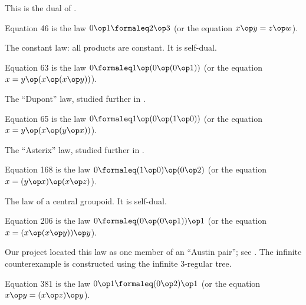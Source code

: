 This is the dual of .

\begin{definition}[Equation 46]\label{eq46}\leanok{}  Equation 46 is the law $0 \op 1  \formaleq  2 \op 3$ (or the equation $x \op y = z \op w$).
\end{definition}

The constant law: all products are constant. It is self-dual.

\begin{definition}[Equation 63]\label{eq63}\leanok{}  Equation 63 is the law $0 \formaleq 1 \op (0 \op (0 \op 1))$ (or the equation $x = y \op (x \op (x \op y))$).
\end{definition}

The ``Dupont'' law, studied further in .

\begin{definition}[Equation 65]\label{eq65}\leanok{}  Equation 65 is the law $0 \formaleq 1 \op (0 \op (1 \op 0))$ (or the equation $x = y \op (x \op (y \op x))$).
\end{definition}

The ``Asterix'' law, studied further in .

\begin{definition}[Equation 168]\label{eq168}\leanok{}  Equation 168 is the law $0  \formaleq  (1 \op 0) \op (0 \op 2)$ (or the equation $x = (y \op x) \op (x \op z)$).
\end{definition}

The law of a central groupoid. It is self-dual.

\begin{definition}[Equation 206]\label{eq206}\leanok{}  Equation 206 is the law $0  \formaleq  (0 \op (0 \op 1)) \op 1$ (or the equation $x = (x \op (x \op y)) \op y$).
\end{definition}

Our project located this law as one member of an ``Austin pair''; see . The infinite counterexample is constructed using the infinite 3-regular tree.

\begin{definition}[Equation 381]\label{eq381}\leanok{}  Equation 381 is the law $0 \op 1  \formaleq  (0 \op 2) \op 1$ (or the equation $x \op y = (x \op z) \op y$).
\end{definition}

